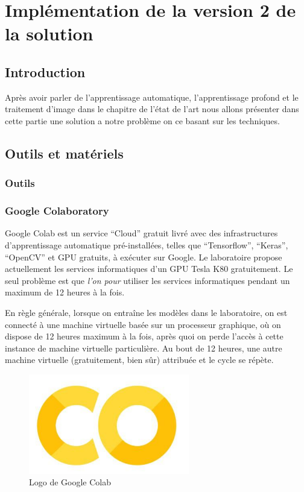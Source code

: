 \documentclass[12pt]{article}
\begin{document}
\section{Implémentation de la version 2 de la solution}
\subsection{Introduction}
Après avoir parler de l’apprentissage automatique, l’apprentissage profond et le traitement d’image dans le chapitre de l’état de l’art nous allons présenter dans cette partie une solution a notre problème on ce basant sur les techniques.

\subsection{Outils et matériels}
\subsubsection{Outils}
\subsubsection*{Google Colaboratory}
Google Colab est un service “Cloud” gratuit livré avec des infrastructures d’apprentissage automatique pré-installées, telles que “Tensorflow”, “Keras”, “OpenCV” et GPU gratuits, à exécuter sur Google. Le laboratoire propose actuellement les services informatiques d’un GPU Tesla K80 gratuitement. Le seul problème est que \textit{l'on pour} utiliser les services informatiques pendant un maximum de 12 heures à la fois. 

En règle générale, lorsque on entraîne les modèles dans le laboratoire, on est connecté à une machine virtuelle basée sur un processeur graphique, où on dispose de 12 heures maximum à la fois, après quoi on perde l'accès à cette instance de machine virtuelle particulière. Au bout de 12 heures, une autre machine virtuelle (gratuitement, bien sûr)  attribuée et le cycle se répète.

\begin{figure}[h]
	\centering
	\includegraphics[width=7cm]{img-Chapiter-4/colab.png}
	\caption{Logo de Google Colab}
\end{figure}
\end{document}
